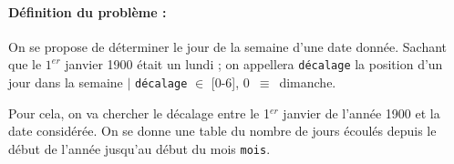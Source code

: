  \noindent\hrulefill  

\paragraph{D\'efinition du probl\`eme : }
On se propose de d\'eterminer le jour de la semaine d'une date donn\'ee. Sachant
que le $1^{er}$ janvier 1900 \'etait un lundi ; on appellera {\tt d\'ecalage} la
position d'un jour dans la semaine $\mid$ {\tt d\'ecalage} $\in$ [0-6], \mbox{0
$\equiv$ dimanche}.  

%
   Pour cela, on va chercher le d\'ecalage entre le 1$^{er}$
   janvier de l'ann\'ee 1900
 et la date consid\'er\'ee.  On se donne une table du nombre
de jours \'ecoul\'es depuis le d\'ebut de l'ann\'ee jusqu'au d\'ebut du mois
{\tt mois}.

